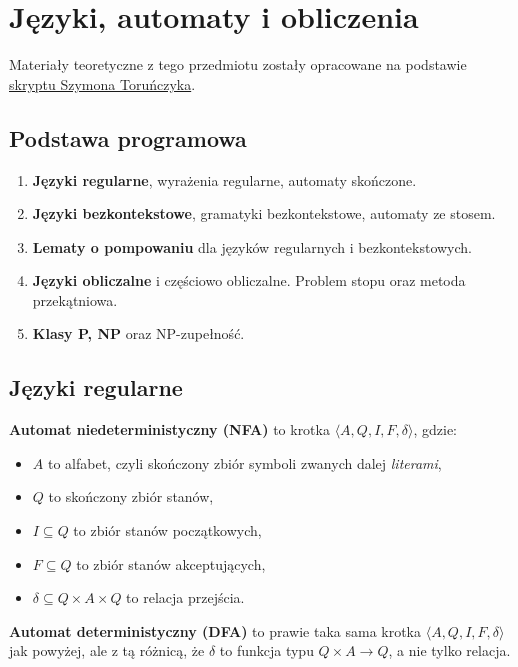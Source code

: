 \chapter{Języki, automaty i obliczenia}

Materiały teoretyczne z tego przedmiotu zostały opracowane na podstawie \href{https://www.mimuw.edu.pl/~szymtor/jao/skrypt.pdf}{skryptu Szymona Toruńczyka}.

\section*{Podstawa programowa}
\begin{enumerate}
    \item \textbf{Języki regularne}, wyrażenia regularne, automaty skończone.
    \item \textbf{Języki bezkontekstowe}, gramatyki bezkontekstowe, automaty ze stosem.
    \item \textbf{Lematy o pompowaniu} dla języków regularnych i bezkontekstowych.
    \item \textbf{Języki obliczalne} i częściowo obliczalne. Problem stopu oraz metoda przekątniowa.
    \item \textbf{Klasy P, NP} oraz NP-zupełność.
\end{enumerate}

\section{Języki regularne}

\textbf{Automat niedeterministyczny (NFA)} to krotka $\langle A, Q, I, F, \delta \rangle$, gdzie:

\begin{itemize}
    \item $A$ to alfabet, czyli skończony zbiór symboli zwanych dalej \textit{literami},
    \item $Q$ to skończony zbiór stanów,
    \item $I \subseteq Q$ to zbiór stanów początkowych,
    \item $F \subseteq Q$ to zbiór stanów akceptujących,
    \item $\delta \subseteq Q \times A \times Q$ to relacja przejścia.
\end{itemize}

\textbf{Automat deterministyczny (DFA)} to prawie taka sama krotka $\langle A, Q, I, F, \delta \rangle$ jak powyżej, ale z tą różnicą, że $\delta$ to funkcja typu $Q \times A \to Q$, a nie tylko relacja.

